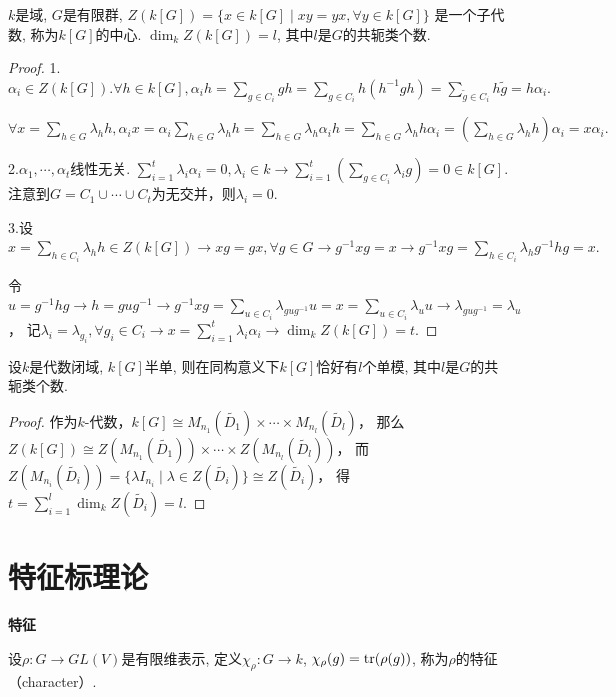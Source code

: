 \begin{proposition}
    $k$是域, $G$是有限群, $Z(k[G])=\{x\in k[G]\mid xy=yx, \forall y\in k[G]\}$
    是一个子代数, 称为$k[G]$的中心. $\dim_k Z(k[G])=l$, 其中$l$是$G$的共轭类个数.
\end{proposition}
\begin{proof}
	1.$\alpha_i\in Z(k[G]).\forall h\in k[G],\alpha _ih=\sum_{g\in C_i}gh
    =\sum_{g\in C_i}h(h^{-1}gh)=\sum_{\tilde{g}\in C_i}h\tilde{g}=h\alpha_i.$
	
	$\forall x=\sum_{h\in G}\lambda_h h,\alpha_i x
    =\alpha_i\sum_{h\in G}\lambda_hh=\sum_{h\in G}\lambda_h \alpha_i h
    =\sum_{h\in G}\lambda_h h \alpha_i 
    =(\sum_{h\in G}\lambda_hh) \alpha_i=x\alpha_i . $
	
	2.$\alpha_1,\cdots,\alpha_t$线性无关. $\sum_{i=1}^{t}\lambda_i\alpha_i=0,\lambda_i \in k
    \rightarrow \sum_{i=1}^{t}(\sum_{g\in C_i}\lambda_i g)=0\in k[G]$.
    注意到$G=C_1\cup\cdots\cup C_t$为无交并，则$\lambda_i=0.$
	
	3.设$x=\sum_{h\in C_i}\lambda_h h\in Z(k[G])
    \rightarrow xg=gx ,\forall g\in G\rightarrow g^{-1}xg=x
    \rightarrow g^{-1}xg=\sum_{h\in C_i}\lambda_h g^{-1}hg=x.$
	
	令$u=g^{-1}hg\rightarrow h=gug^{-1}
    \rightarrow g^{-1}xg=\sum_{u\in C_i}\lambda_{gug^{-1}}u=x=\sum_{u\in C_i}\lambda_uu
    \rightarrow \lambda_{gug^{-1}}=\lambda_u$，
    记$\lambda_i=\lambda_{g_i},\forall g_i\in C_i
    \rightarrow x=\sum_{i=1}^{t}\lambda_i\alpha_i\rightarrow \dim_k Z(k[G])=t$.
	
\end{proof}
\begin{corollary}
    设$k$是代数闭域, $k[G]$半单, 则在同构意义下$k[G]$恰好有$l$个单模, 
    其中$l$是$G$的共轭类个数.
\end{corollary}
\begin{proof}
	作为$k$-代数，$k[G]\cong M_{n_1}(\tilde{D_1})\times \cdots \times M_{n_l}(\tilde{D_l})$，
    那么$Z(k[G])\cong Z(M_{n_1}(\tilde{D_1}))\times \cdots \times Z(M_{n_l}(\tilde{D_l}))$，
    而$Z(M_{n_i}(\tilde{D_i}))=\{\lambda I_{n_i}\mid\lambda\in Z(\tilde{D_i})\}\cong Z(\tilde{D_i})$，
    得$t=\sum_{i=1}^{l}\dim_k Z(\tilde{D_i})=l$.
\end{proof}


\section{特征标理论}
\begin{definition} \textbf{特征}\par
    \qquad 设$\rho:G\rightarrow GL(V)$是有限维表示, 
    定义$\chi_\rho:G\rightarrow k$, 
    $\chi_\rho(g)=\operatorname{tr}(\rho(g))$, 称为$\rho$的特征（character）.

\end{definition}

